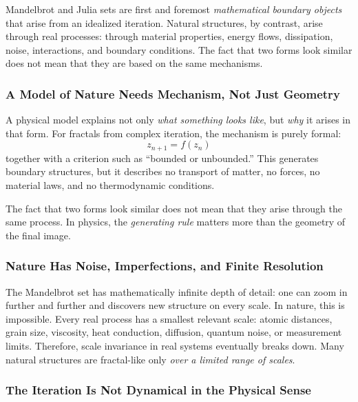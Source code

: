 Mandelbrot and Julia sets are first and foremost \emph{mathematical boundary objects}
that arise from an idealized iteration.
Natural structures, by contrast, arise through real processes:
through material properties, energy flows, dissipation, noise, interactions, and boundary conditions.
The fact that two forms look similar
does not mean
that they are based on the same mechanisms.

\subsubsection*{A Model of Nature Needs Mechanism, Not Just Geometry}

A physical model explains not only
\emph{what something looks like},
but \emph{why} it arises in that form.
For fractals from complex iteration, the mechanism is purely formal:
\[
z_{n+1}=f(z_n)
\]
together with a criterion such as
``bounded or unbounded.''
This generates boundary structures,
but it describes no transport of matter,
no forces,
no material laws,
and no thermodynamic conditions.

\begin{DidacticBox}
	\label{box:visual}
	\small
	The fact that two forms look similar
	does not mean
	that they arise through the same process.
	In physics, the \emph{generating rule}
	matters more than the geometry of the final image.
\end{DidacticBox}

\subsubsection*{Nature Has Noise, Imperfections, and Finite Resolution}

The Mandelbrot set has mathematically infinite depth of detail:
one can zoom in further and further
and discovers new structure on every scale.
In nature, this is impossible.
Every real process has a smallest relevant scale:
atomic distances, grain size, viscosity, heat conduction, diffusion, quantum noise, or measurement limits.
Therefore, scale invariance in real systems eventually breaks down.
Many natural structures are fractal-like only \emph{over a limited range of scales}.

\subsubsection*{The Iteration Is Not Dynamical in the Physical Sense}

